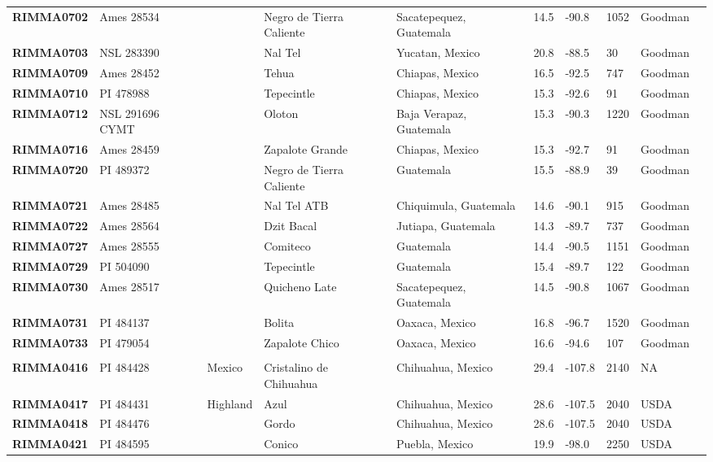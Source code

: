 \begin{table}[h]
\begin{center}
{\begin{tabular}{llllllllll}
{\bf RIMMA0702}	&	Ames 28534	&		&	Negro de Tierra Caliente	&	Sacatepequez, Guatemala	&	14.5 	&	-90.8 	&	1052	&	Goodman	\\
{\bf RIMMA0703}	&	NSL 283390	&		&	Nal Tel	&	Yucatan, Mexico	&	20.8 	&	-88.5 	&	30	&	Goodman	\\
{\bf RIMMA0709}	&	Ames 28452	&		&	Tehua	&	Chiapas, Mexico	&	16.5 	&	-92.5 	&	747	&	Goodman	\\
{\bf RIMMA0710}	&	PI 478988	&		&	Tepecintle	&	Chiapas, Mexico	&	15.3 	&	-92.6 	&	91	&	Goodman	\\
{\bf RIMMA0712}	&	NSL 291696 CYMT	&		&	Oloton	&	Baja Verapaz, Guatemala	&	15.3 	&	-90.3 	&	1220	&	Goodman	\\
{\bf RIMMA0716}	&	Ames 28459	&		&	Zapalote Grande	&	Chiapas, Mexico	&	15.3 	&	-92.7 	&	91	&	Goodman	\\
{\bf RIMMA0720}	&	PI 489372	&		&	Negro de Tierra Caliente	&	Guatemala	&	15.5 	&	-88.9 	&	39	&	Goodman	\\
{\bf RIMMA0721}	&	Ames 28485	&		&	Nal Tel ATB	&	Chiquimula, Guatemala	&	14.6 	&	-90.1 	&	915	&	Goodman	\\
{\bf RIMMA0722}	&	Ames 28564	&		&	Dzit Bacal	&	Jutiapa, Guatemala	&	14.3 	&	-89.7 	&	737	&	Goodman	\\
{\bf RIMMA0727}	&	Ames 28555	&		&	Comiteco	&	Guatemala	&	14.4 	&	-90.5 	&	1151	&	Goodman	\\
{\bf RIMMA0729}	&	PI 504090	&		&	Tepecintle	&	Guatemala	&	15.4 	&	-89.7 	&	122	&	Goodman	\\
{\bf RIMMA0730}	&	Ames 28517	&		&	Quicheno Late	&	Sacatepequez, Guatemala	&	14.5 	&	-90.8 	&	1067	&	Goodman	\\
{\bf RIMMA0731}	&	PI 484137	&		&	Bolita	&	Oaxaca, Mexico	&	16.8 	&	-96.7 	&	1520	&	Goodman	\\
{\bf RIMMA0733}	&	PI 479054	&		&	Zapalote Chico	&	Oaxaca, Mexico	&	16.6 	&	-94.6 	&	107	&	Goodman	\\
	\hline 
	& & & \\[-4mm] 
{\bf RIMMA0416}	&	PI 484428	&	Mexico	&	Cristalino de Chihuahua	&	Chihuahua, Mexico	&	29.4 	&	-107.8 	&	2140	&	NA	\\
{\bf RIMMA0417}	&	PI 484431	&	Highland	&	Azul	&	Chihuahua, Mexico	&	28.6 	&	-107.5 	&	2040	&	USDA	\\
{\bf RIMMA0418}	&	PI 484476	&		&	Gordo	&	Chihuahua, Mexico	&	28.6 	&	-107.5 	&	2040	&	USDA	\\
{\bf RIMMA0421}	&	PI 484595	&		&	Conico	&	Puebla, Mexico	&	19.9 	&	-98.0 	&	2250	&	USDA	\\

\end{tabular}}
\end{center}
\end{table}
